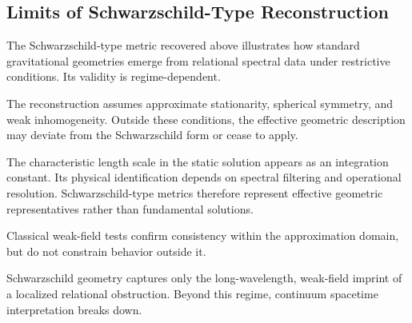 \subsection{Limits of Schwarzschild-Type Reconstruction}
  \label{subsec:limits-schwarzschild}

  The Schwarzschild-type metric recovered above
  illustrates how standard gravitational geometries
  emerge from relational spectral data under restrictive conditions.
  Its validity is regime-dependent.

  The reconstruction assumes approximate stationarity,
  spherical symmetry, and weak inhomogeneity.
  Outside these conditions,
  the effective geometric description may deviate
  from the Schwarzschild form or cease to apply.

  The characteristic length scale in the static solution
  appears as an integration constant.
  Its physical identification depends on spectral filtering
  and operational resolution.
  Schwarzschild-type metrics therefore represent effective
  geometric representatives rather than fundamental solutions.

  Classical weak-field tests confirm consistency within
  the approximation domain,
  but do not constrain behavior outside it.

  Schwarzschild geometry captures only the long-wavelength,
  weak-field imprint of a localized relational obstruction.
  Beyond this regime,
  continuum spacetime interpretation breaks down.

